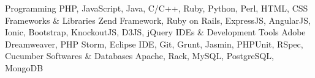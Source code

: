 \begin{cvskills}
  \cvskill
    {Programming}
    {PHP, JavaScript, Java, C/C++,  Ruby, Python, Perl, HTML, CSS}
  \cvskill
  {Frameworks \& Libraries}
  {Zend Framework, Ruby on Rails, ExpressJS, AngularJS, Ionic, Bootstrap, KnockoutJS, D3JS, jQuery}  
  \cvskill
  {IDEs \& Development Tools}
  {Adobe Dreamweaver, PHP Storm, Eclipse IDE, Git, Grunt, Jasmin, PHPUnit, RSpec, Cucumber}  
  \cvskill
  {Softwares \& Databases}
  {Apache, Rack, MySQL, PostgreSQL, MongoDB}      
    
\end{cvskills}
